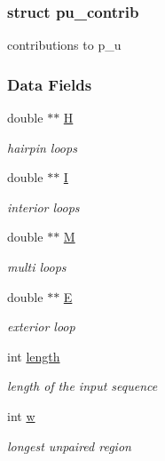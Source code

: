 \subsubsection{struct pu\+\_\+contrib}
contributions to p\+\_\+u \subsubsection*{Data Fields}
\begin{DoxyCompactItemize}
\item 
double $\ast$$\ast$ \mbox{\hyperlink{group__data__structures_ac9034ac9a84ed0647587659d6e9be1e8}{H}}
\begin{DoxyCompactList}\small\item\em hairpin loops \end{DoxyCompactList}\item 
double $\ast$$\ast$ \mbox{\hyperlink{group__data__structures_a8ca0da20536780589fb3e3472ca0581f}{I}}
\begin{DoxyCompactList}\small\item\em interior loops \end{DoxyCompactList}\item 
double $\ast$$\ast$ \mbox{\hyperlink{group__data__structures_a1222ebf74f426bbcd843dcc325da207b}{M}}
\begin{DoxyCompactList}\small\item\em multi loops \end{DoxyCompactList}\item 
double $\ast$$\ast$ \mbox{\hyperlink{group__data__structures_accb192ba6b4b91a1cb2f8080934fd428}{E}}
\begin{DoxyCompactList}\small\item\em exterior loop \end{DoxyCompactList}\item 
int \mbox{\hyperlink{group__data__structures_a33d5ada6e861db0c81aa3d5b2989262e}{length}}
\begin{DoxyCompactList}\small\item\em length of the input sequence \end{DoxyCompactList}\item 
int \mbox{\hyperlink{group__data__structures_a403c1c7f20beeeffba7632fac0cfcbff}{w}}
\begin{DoxyCompactList}\small\item\em longest unpaired region \end{DoxyCompactList}\end{DoxyCompactItemize}


